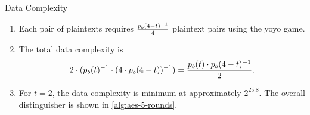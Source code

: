 \documentclass[notheorems]{beamer}
\theoremstyle{definition}
\theoremstyle{example}
\begin{document}
    \begin{frame}[<+->]{Data Complexity}
        \begin{enumerate}
            \item Each pair of plaintexts requires \(\frac{p_b(4 -
            t)^{-1}}{4}\) plaintext pairs using the yoyo game. 
            \item The total data complexity is
            \begin{equation}
                2 \cdot (p_b(t)^{-1} \cdot (4 \cdot p_b(4 - t))^{-1}) = \frac{p_b(t) \cdot p_b(4 - t)^{-1}}{2}.
            \end{equation}
            \item For \(t = 2\), the data complexity is minimum at approximately
            \(2^{25.8}\). The overall distinguisher is shown in
            \cref{alg:aes-5-rounds}.
        \end{enumerate} 
    \end{frame}
\end{document}
